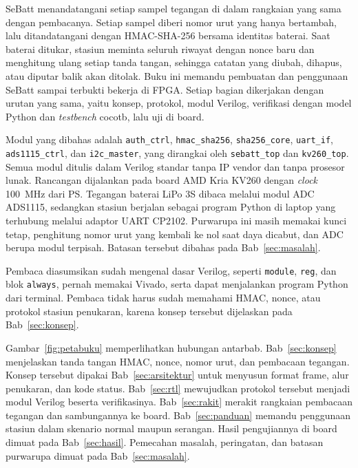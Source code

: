 \documentclass[11pt,a4paper]{article}
\begin{document}
SeBatt menandatangani setiap sampel tegangan di dalam rangkaian yang sama dengan pembacanya.
Setiap sampel diberi nomor urut yang hanya bertambah, lalu ditandatangani dengan HMAC-SHA-256
bersama identitas baterai. Saat baterai ditukar, stasiun meminta seluruh riwayat dengan nonce
baru dan menghitung ulang setiap tanda tangan, sehingga catatan yang diubah, dihapus, atau
diputar balik akan ditolak. Buku ini memandu pembuatan dan penggunaan SeBatt sampai terbukti
bekerja di FPGA. Setiap bagian dikerjakan dengan urutan yang sama, yaitu konsep, protokol, modul
Verilog, verifikasi dengan model Python dan \textit{testbench} cocotb, lalu uji di board.

{\sloppy
Modul yang dibahas adalah \texttt{auth\_ctrl}, \texttt{hmac\_sha256}, \texttt{sha256\_core},
\texttt{uart\_if}, \texttt{ads1115\_ctrl}, dan \texttt{i2c\_master}, yang dirangkai oleh
\texttt{sebatt\_top} dan \texttt{kv260\_top}. Semua modul ditulis dalam Verilog standar tanpa IP
vendor dan tanpa prosesor lunak. Rancangan dijalankan pada board AMD Kria KV260 dengan
\textit{clock} 100~MHz dari PS. Tegangan baterai LiPo 3S dibaca melalui modul ADC ADS1115,
sedangkan stasiun berjalan sebagai program Python di laptop yang terhubung melalui adaptor UART
CP2102. Purwarupa ini masih memakai kunci tetap, penghitung nomor urut yang kembali ke nol saat
daya dicabut, dan ADC berupa modul terpisah. Batasan tersebut dibahas pada Bab~\ref{sec:masalah}.
\par}

Pembaca diasumsikan sudah mengenal dasar Verilog, seperti \texttt{module}, \texttt{reg}, dan
blok \texttt{always}, pernah memakai Vivado, serta dapat menjalankan program Python dari
terminal. Pembaca tidak harus sudah memahami HMAC, nonce, atau protokol stasiun penukaran, karena
konsep tersebut dijelaskan pada Bab~\ref{sec:konsep}.

Gambar~\ref{fig:petabuku} memperlihatkan hubungan antarbab. Bab~\ref{sec:konsep} menjelaskan
tanda tangan HMAC, nonce, nomor urut, dan pembacaan tegangan. Konsep tersebut dipakai
Bab~\ref{sec:arsitektur} untuk menyusun format frame, alur penukaran, dan kode status.
Bab~\ref{sec:rtl} mewujudkan protokol tersebut menjadi modul Verilog beserta verifikasinya.
Bab~\ref{sec:rakit} merakit rangkaian pembacaan tegangan dan sambungannya ke board.
Bab~\ref{sec:panduan} memandu penggunaan stasiun dalam skenario normal maupun serangan. Hasil
pengujiannya di board dimuat pada Bab~\ref{sec:hasil}. Pemecahan masalah, peringatan, dan batasan
purwarupa dimuat pada Bab~\ref{sec:masalah}.
\end{document}
